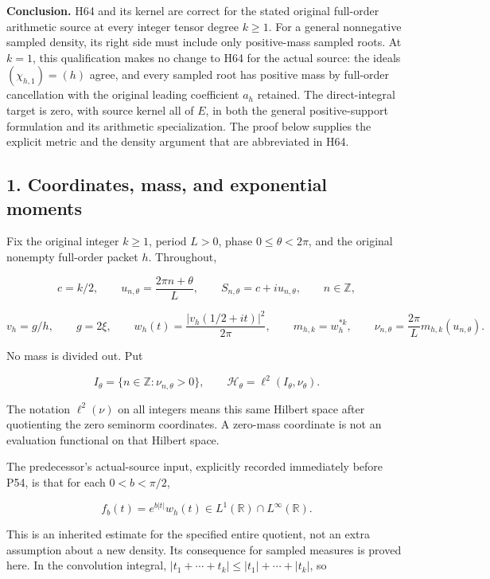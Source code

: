 \textbf{Conclusion.} H64 and its kernel are correct for the stated original full-order arithmetic source at every integer tensor degree \(k \ge 1\). For a general nonnegative sampled density, its right side must include only positive-mass sampled roots. At \(k = 1\), this qualification makes no change to H64 for the actual source: the ideals \((\chi_{h,1})=(h)\) agree, and every sampled root has positive mass by full-order cancellation with the original leading coefficient \(a_h\) retained. The direct-integral target is zero, with source kernel all of \(E\), in both the general positive-support formulation and its arithmetic specialization. The proof below supplies the explicit metric and the density argument that are abbreviated in H64.

\subsection{1. Coordinates, mass, and exponential moments}\label{coordinates-mass-and-exponential-moments}

Fix the original integer \(k \ge 1\), period \(L > 0\), phase \(0 \le \theta < 2 \pi\), and the original nonempty full-order packet \(h\). Throughout,

\[
c=k/2,\qquad
u_{n,\theta}=\frac{2\pi n+\theta}{L},\qquad
S_{n,\theta}=c+i u_{n,\theta},\qquad n\in\mathbb Z,
\tag{CQ1}
\]

\[
v_h=g/h,\qquad g=2\xi,\qquad
w_h(t)=\frac{|v_h(1/2+it)|^2}{2\pi},\qquad
m_{h,k}=w_h^{*k},\qquad
\nu_{n,\theta}=\frac{2\pi}{L}m_{h,k}(u_{n,\theta}).
\tag{CQ2}
\]

No mass is divided out. Put

\[
I_\theta=\{n\in\mathbb Z:\nu_{n,\theta}>0\},\qquad
\mathcal H_\theta=\ell^2(I_\theta,\nu_\theta).
\tag{CQ3}
\]

The notation \(\ell^2(\nu)\) on all integers means this same Hilbert space after quotienting the zero seminorm coordinates. A zero-mass coordinate is not an evaluation functional on that Hilbert space.

The predecessor's actual-source input, explicitly recorded immediately before P54, is that for each \(0 < b < \pi/2\),

\[
f_b(t)=e^{b|t|}w_h(t)\in L^1(\mathbb R)\cap L^\infty(\mathbb R).
\tag{CQ4}
\]

This is an inherited estimate for the specified entire quotient, not an extra assumption about a new density. Its consequence for sampled measures is proved here. In the convolution integral, \(|t_1+\cdots+t_k| \le |t_1|+\cdots+|t_k|\), so

